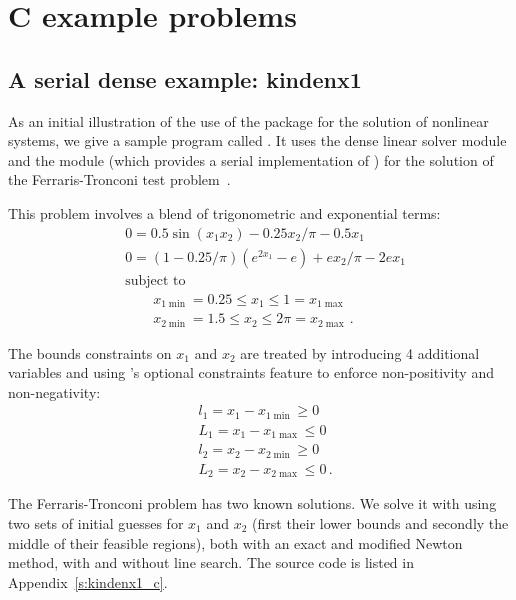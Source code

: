 \section{C example problems}\label{s:ex_c}

\subsection{A serial dense example: kindenx1}\label{ss:kindenx1}

As an initial illustration of the use of the {\kinsol} package for the
solution of nonlinear systems, we give a sample program called .
It uses the {\kinsol} dense linear solver module {\kindense} 
and the {\nvecs} module (which provides a serial implementation of {\nvector})
for the solution of the Ferraris-Tronconi test problem~\cite{FlPa:99}.

This problem involves a blend of trigonometric and exponential terms:
\begin{equation}
\begin{split}
  & 0 = 0.5 \sin(x_1 x_2) - 0.25 x_2/\pi - 0.5 x_1 \\
  & 0 = (1-0.25/\pi) ( e^{2 x_1} - e ) + e x_2 / \pi - 2 e x_1 \\
  &\text{subject to } \\
  &\qquad x_{1\min} = 0.25 \le x_1 \le 1 = x_{1\max} \\
  &\qquad x_{2\min} = 1.5 \le x_2 \le 2\pi = x_{2\max} \, .
\end{split}
\end{equation}

The bounds constraints on $x_1$ and $x_2$ are treated by introducing 4 additional
variables and using {\kinsol}'s optional constraints feature to enforce non-positivity
and non-negativity:
\begin{equation*}
\begin{split}
  &l_1 = x_1 - x_{1\min} \ge 0\\
  &L_1 = x_1 - x_{1\max} \le 0\\
  &l_2 = x_2 - x_{2\min} \ge 0\\
  &L_2 = x_2 - x_{2\max} \le 0 \, .
\end{split}
\end{equation*}

The Ferraris-Tronconi problem has two known solutions. We solve it with
{\kinsol} using two sets of initial guesses for $x_1$ and $x_2$ (first their 
lower bounds and secondly the middle of their feasible regions), both with
an exact and modified Newton method, with and without line search.
The source code is listed in Appendix~\ref{s:kindenx1_c}.

